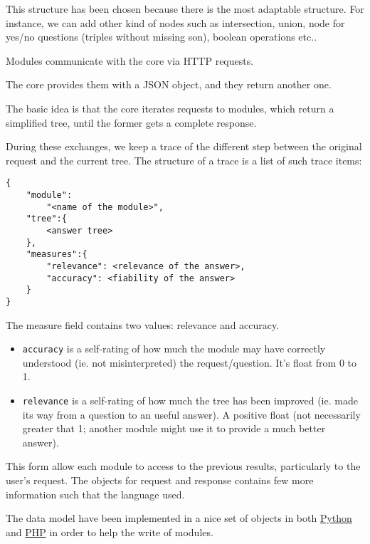 This structure has been chosen because there is the most adaptable structure. For instance, we can add other kind of nodes such as intersection, union, node for yes/no questions (triples without missing son), boolean operations etc..

\bigskip

Modules communicate with the core via HTTP requests.

The core provides them with a JSON object, and they return another one.

The basic idea is that the core iterates requests to modules, which return a simplified tree, until the former gets a complete response.

During these exchanges, we keep a trace of the different step between the original request and the current tree. The structure of a trace is a list of such trace items:
\begin{verbatim}
{
    "module":
        "<name of the module>", 
    "tree":{
        <answer tree>
    },
    "measures":{
        "relevance": <relevance of the answer>,
        "accuracy": <fiability of the answer>
    }
}
\end{verbatim}

The measure field contains two values: relevance and accuracy.

\begin{itemize}
    \item \texttt{accuracy} is a self-rating of how much the module may have correctly understood (ie. not misinterpreted) the request/question. It's float from 0 to 1.
    \item \texttt{relevance} is a self-rating of how much the tree has been improved (ie. made its way from a question to an useful answer). A positive float (not necessarily greater that 1; another module might use it to provide a much better answer).
\end{itemize}

This form allow each module to access to the previous results, particularly to the user's request. The objects for request and response contains few more information such that the language used.

The data model have been implemented in a nice set of objects in both \href{http://github.com/ProjetPP/PPP-datamodel-Python}{Python} and \href{http://github.com/ProjetPP/PPP-datamodel-PHP}{PHP} in order to help the write of modules.

